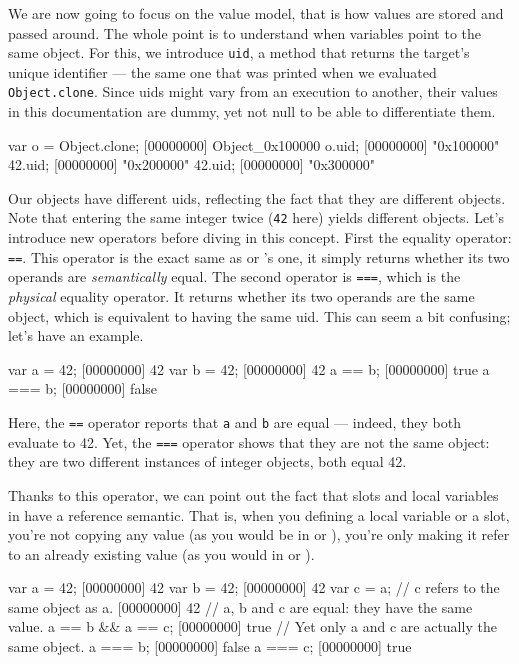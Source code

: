 We are now going to focus on the \us value model, that is how values
are stored and passed around. The whole point is to understand when
variables point to the same object.  For this, we introduce
\lstinline{uid}, a method that returns the target's unique identifier
--- the same one that was printed when we evaluated
\lstinline|Object.clone|.  Since uids might vary from an execution to
another, their values in this documentation are dummy, yet not null to
be able to differentiate them.

\begin{urbiscript}[firstnumber=1]
var o = Object.clone;
[00000000] Object_0x100000
o.uid;
[00000000] "0x100000"
42.uid;
[00000000] "0x200000"
42.uid;
[00000000] "0x300000"
\end{urbiscript}

Our objects have different uids, reflecting the fact that they are
different objects. Note that entering the same integer twice
(\lstinline{42} here) yields different objects. Let's introduce new
operators before diving in this concept. First the equality operator:
\lstinline{==}. This operator is the exact same as \C or \Cxx's one,
it simply returns whether its two operands are \emph{semantically}
equal. The second operator is \lstinline{===}, which is the
\emph{physical} equality operator. It returns whether its two operands
are the same object, which is equivalent to having the same uid. This
can seem a bit confusing; let's have an example.

\begin{urbiscript}
var a = 42;
[00000000] 42
var b = 42;
[00000000] 42
a == b;
[00000000] true
a === b;
[00000000] false
\end{urbiscript}

Here, the \lstinline{==} operator reports that \lstinline{a} and
\lstinline{b} are equal ---
indeed, they both evaluate to 42. Yet, the \lstinline{===} operator shows
that they are not the same object: they are two different
instances of integer objects, both equal 42.

Thanks to this operator, we can point out the fact that slots and
local variables in \us have a reference semantic. That is, when you
defining a local variable or a slot, you're not copying any value (as
you would be in \C or \Cxx), you're only making it refer to an already
existing value (as you would in \ruby or \java).

\begin{urbiscript}[firstnumber=1]
var a = 42;
[00000000] 42
var b = 42;
[00000000] 42
var c = a; // c refers to the same object as a.
[00000000] 42
// a, b and c are equal: they have the same value.
a == b && a == c;
[00000000] true
// Yet only a and c are actually the same object.
a === b;
[00000000] false
a === c;
[00000000] true
\end{urbiscript}

